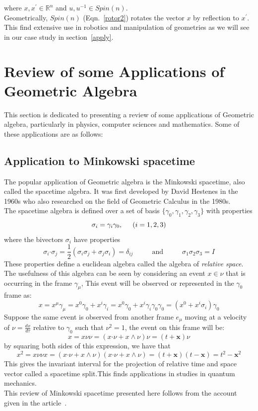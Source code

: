 \documentclass[12pt,onecolumn,letterpaper]{article} %
\begin{document}
where $x,x^'\in \mathbb{R}^n$ and $u,u^{-1}\in Spin(n)$.\\
Geometrically, $Spin(n)$ (Eqn.~\ref{rotor2}) rotates the vector $x$ by reflection to $x^'$. This find extensive use in robotics and manipulation of geometries as we will see in our case study in section~\ref{apply}. 
 \section{Review of some Applications of Geometric Algebra}\label{review}
 This section is dedicated to presenting a review of some applications of Geometric algebra, particularly in physics, computer sciences and mathematics. Some of these applications are as follows:
 
 \subsection{Application to Minkowski spacetime}
 The popular application of Geometric algebra is the Minkowski spacetime, also called the spacetime algebra. It was first developed by David Hestenes in the 1960s who also researched on the field of Geometric Calculus in the 1980s.\\
 The spacetime algebra is defined over a set of basis $\{\gamma_0,\gamma_1,\gamma_2,\gamma_3\}$ with properties
 $$\sigma_i=\gamma_i\gamma_0, \hspace{.5cm} (i=1,2,3)$$
 where the bivectors $\sigma_i$ have properties
$$\sigma_i\boldsymbol{\cdot}\sigma_j=\frac{1}{2}(\sigma_i\sigma_j+\sigma_j\sigma_i)=\delta_{ij}\hspace{1cm} {\mbox{  and }}\hspace{1cm}  \sigma_1\sigma_2\sigma_3=I$$
These properties define a euclidean algebra called the algebra of \emph{relative space}. The usefulness of this algebra can be seen by considering an event $x\in \nu$ that is occurring in the frame $\gamma_{\mu}$, This event will be observed or represented in the $\gamma_0$ frame as:
$$x=x^{\mu}\gamma_{\mu}=x^0\gamma_0+x^i\gamma_i=x^0\gamma_0+x^i\gamma_i\gamma_0\gamma_0=(x^0+x^i\sigma_i)\gamma_0$$
Suppose the same event is observed from another frame $e_\mu$ moving at a velocity of $\nu=\frac{dx}{d\tau}$ relative to $\gamma_0$ such that $\nu^2=1$, the event on this frame will be:
$$x=x\nu\nu=(x\boldsymbol{\cdot}\nu+x\wedge \nu)\nu=(t+\textbf{x})\nu$$
by squaring both sides of this expression, we have that
$$x^2=x\nu\nu x=(x\boldsymbol{\cdot}\nu+x\wedge \nu)(x\boldsymbol{\cdot}\nu+x\wedge \nu)=(t+\textbf{x})(t-\textbf{x})=t^2-\textbf{x}^2$$
This gives the invariant interval for the projection of relative time and space vector called a spacetime split.This finds applications in studies in quantum mechanics.\\
This review of  Minkowski spacetime presented here follows from the account given in the article~\cite{lundholm2006geometric}.
\end{document}
